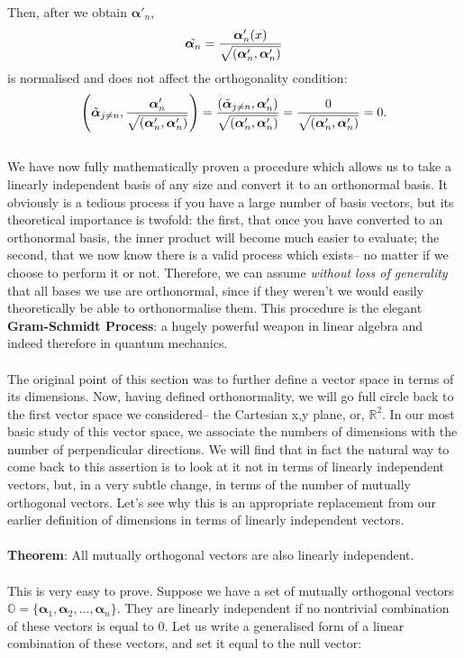 Then, after we obtain $\bm{\alpha}'_{n}$,
$$
\tilde{\bm{\alpha}_{n}}=\frac{\bm{\alpha}'_{n}(x)}{\sqrt{\left(\bm{\alpha}'_{n},\bm{\alpha}'_{n}\right)}}
$$
is normalised and does not affect the orthogonality condition:
$$
\left(\tilde{\bm{\alpha}}_{j\neq n}, \frac{\bm{\alpha}'_{n}}{\sqrt{\left(\bm{\alpha}'_{n},\bm{\alpha}'_{n}\right)}}\right)=\frac{\left(\tilde{\bm{\alpha}}_{j\neq n},\bm{\alpha}'_{n}\right)}{\sqrt{\left(\bm{\alpha}'_{n},\bm{\alpha}'_{n}\right)}}= \frac{0}{\sqrt{\left(\bm{\alpha}'_{n},\bm{\alpha}'_{n}\right)}}=0.
$$
\\
We have now fully mathematically proven a procedure which allows us to take a linearly independent basis of any size and convert it to an orthonormal basis. It obviously is a tedious process if you have a large number of basis vectors, but its theoretical importance is twofold: the first, that once you have converted to an orthonormal basis, the inner product will become much easier to evaluate; the second, that we now know there is a valid process which exists-- no matter if we choose to perform it or not. Therefore, we can assume \textit{without loss of generality} that all bases we use are orthonormal, since if they weren't we would easily theoretically be able to orthonormalise them. This procedure is the elegant \textbf{Gram-Schmidt Process}: a hugely powerful weapon in linear algebra and indeed therefore in quantum mechanics.
\\\\
The original point of this section was to further define a vector space in terms of its dimensions. Now, having defined orthonormality, we will go full circle back to the first vector space we considered-- the Cartesian x,y plane, or, $\mathbb{R}^2$. In our most basic study of this vector space, we associate the numbers of dimensions with the number of perpendicular directions. We will find that in fact the natural way to come back to this assertion is to look at it not in terms of linearly independent vectors, but, in a very subtle change, in terms of the number of mutually orthogonal vectors. Let's see why this is an appropriate replacement from our earlier definition of dimensions in terms of linearly independent vectors.
\\\\
\textbf{Theorem}: All mutually orthogonal vectors are also linearly independent.
\\\\
This is very easy to prove. Suppose we have a set of mutually orthogonal vectors $\mathbb{O}=\{\bm{\alpha}_{1}, \bm{\alpha}_{2}, ..., \bm{\alpha}_{n}\}$. They are linearly independent if no nontrivial combination of these vectors is equal to $0$. Let us write a generalised form of a linear combination of these vectors, and set it equal to the null vector:
